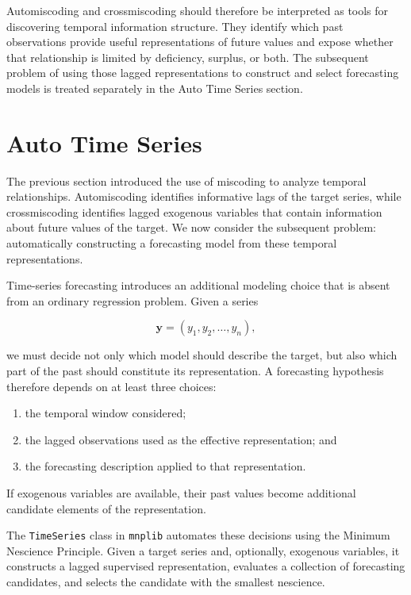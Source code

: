Automiscoding and crossmiscoding should therefore be interpreted as tools for
discovering temporal information structure. They identify which past
observations provide useful representations of future values and expose whether
that relationship is limited by deficiency, surplus, or both. The subsequent
problem of using those lagged representations to construct and select forecasting
models is treated separately in the Auto Time Series section.

%
%

\section{Auto Time Series}
\label{sec:auto_time_series}

The previous section introduced the use of miscoding to analyze temporal
relationships. Automiscoding identifies informative lags of the target series,
while crossmiscoding identifies lagged exogenous variables that contain
information about future values of the target. We now consider the subsequent
problem: automatically constructing a forecasting model from these temporal
representations.

Time-series forecasting introduces an additional modeling choice that is absent
from an ordinary regression problem. Given a series

\[
\mathbf{y}
=
(y_1,y_2,\ldots,y_n),
\]

we must decide not only which model should describe the target, but also which
part of the past should constitute its representation. A forecasting hypothesis
therefore depends on at least three choices:

\begin{enumerate}
    \item the temporal window considered;
    \item the lagged observations used as the effective representation; and
    \item the forecasting description applied to that representation.
\end{enumerate}

If exogenous variables are available, their past values become additional
candidate elements of the representation.

The \texttt{TimeSeries} class in \texttt{mnplib} automates these decisions using
the Minimum Nescience Principle. Given a target series and, optionally,
exogenous variables, it constructs a lagged supervised representation, evaluates
a collection of forecasting candidates, and selects the candidate with the
smallest nescience.

